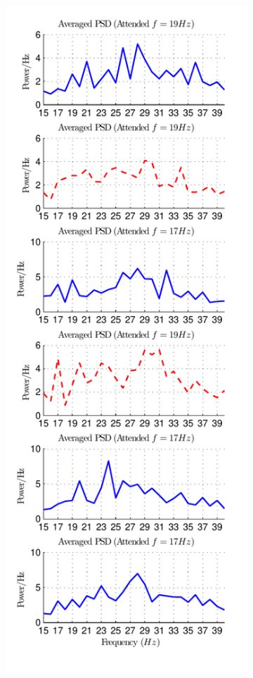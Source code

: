 \documentclass[12pt]{article}
\numberwithin{equation}{section}
\numberwithin{figure}{section}
\numberwithin{table}{section}
\begin{document}
\newpage
\begin{figure}
    \centering
    \begin{subfigure}{.5\textwidth}
        \centering
        \includegraphics[scale=0.85]{images/results-psd-PU_23-01-2014-18-48}

\end{subfigure}
\end{figure}
\end{document}
